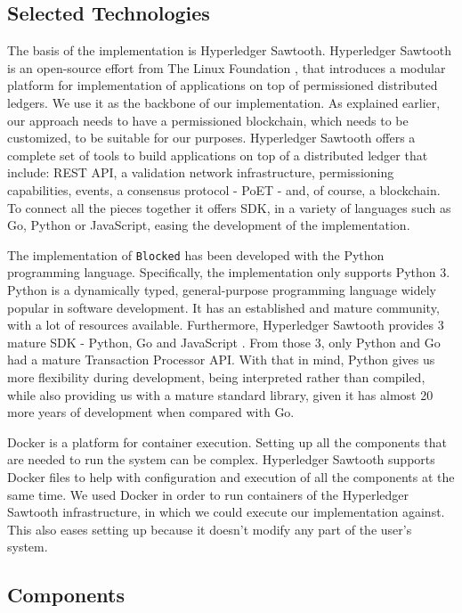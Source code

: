 \subsection{Selected Technologies}
\label{sec:implementation-technology}

The basis of the implementation is Hyperledger Sawtooth. Hyperledger Sawtooth is an open-source effort from The Linux Foundation \cite{linuxfoundation}, that introduces a modular platform for implementation of applications on top of permissioned distributed ledgers. We use it as the backbone of our implementation. As explained earlier, our approach needs to have a permissioned blockchain, which needs to be customized, to be suitable for our purposes. Hyperledger Sawtooth offers a complete set of tools to build applications on top of a distributed ledger that include: REST API, a validation network infrastructure, permissioning capabilities, events, a consensus protocol - PoET \cite{intel_poet} - and, of course, a blockchain. To connect all the pieces together it offers SDK, in a variety of languages such as Go, Python or JavaScript, easing the development of the implementation.

The implementation of \texttt{Blocked} has been developed with the Python \cite{python} programming language. Specifically, the implementation only supports Python 3. Python is a dynamically typed, general-purpose programming language widely popular in software development. It has an established and mature community, with a lot of resources available. Furthermore, Hyperledger Sawtooth provides 3 mature SDK - Python, Go \cite{golang} and JavaScript \cite{nodejs}. From those 3, only Python and Go had a mature Transaction Processor API. With that in mind, Python gives us more flexibility during development, being interpreted rather than compiled, while also providing us with a mature standard library, given it has almost 20 more years of development when compared with Go.

Docker is a platform for container execution. Setting up all the components that are needed to run the system can be complex. Hyperledger Sawtooth supports Docker files to help with configuration and execution of all the components at the same time. We used Docker in order to run containers of the Hyperledger Sawtooth infrastructure, in which we could execute our implementation against. This also eases setting up because it doesn't modify any part of the user's system.

\subsection{Components}
\label{sec:implementation-core}

